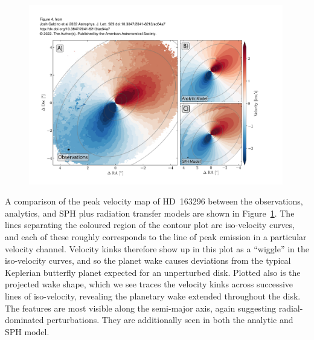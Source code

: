 \begin{figure}
    \centering
    \includegraphics[width = 0.99\textwidth]{figures/calcino_v0.pdf}
    \caption{}
    \label{fig:calcino_v0}
\end{figure}

A comparison of the peak velocity map of HD~163296 between the observations, analytics, and SPH plus radiation transfer models are shown in Figure~\ref{fig:calcino_v0}.
The lines separating the coloured region of the contour plot are iso-velocity curves, and each of these roughly corresponds to the line of peak emission in a particular velocity channel.
Velocity kinks therefore show up in this plot as a ``wiggle'' in the iso-velocity curves, and so the planet wake causes deviations from the typical Keplerian butterfly planet expected for an unperturbed disk.
Plotted also is the projected wake shape, which we see traces the velocity kinks across successive lines of iso-velocity, revealing the planetary wake extended throughout the disk. 
The features are most visible along the semi-major axis, again suggesting radial-dominated perturbations.
They are additionally seen in both the analytic and SPH model.


%

